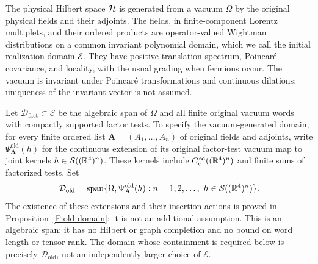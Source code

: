 \begin{assumption}\label{ass:framework}
The physical Hilbert space $\mathcal H$ is generated from a vacuum $\Omega$ by
the original physical fields and their adjoints. The fields, in finite-component
Lorentz multiplets, and their ordered products are operator-valued
Wightman distributions on a common invariant polynomial domain, which we
call the initial realization domain $\mathcal E$. They have positive translation spectrum,
Poincar\'e covariance, and locality,
with the usual grading when fermions occur. The vacuum is invariant under
Poincar\'e transformations and continuous dilations; uniqueness of the
invariant vector is not assumed.

Let $\mathcal D_{\mathrm{fact}}\subset\mathcal E$ be the algebraic span of
$\Omega$ and all finite original vacuum words with compactly supported
factor tests. To specify the vacuum-generated domain, for every finite ordered list $\mathbf A=(A_1,\ldots,A_n)$ of original fields and adjoints,
write $\Psi^{\mathrm{old}}_{\mathbf A}(h)$ for the continuous extension of
its original factor-test vacuum map to joint kernels
$h\in\mathcal S((\mathbb R^4)^n)$. These kernels
include $C_c^\infty((\mathbb R^4)^n)$ and finite sums of factorized tests. Set
\[
 \mathcal D_{\mathrm{old}}
 =\operatorname{span}\{\Omega,\Psi^{\mathrm{old}}_{\mathbf A}(h):
          n=1,2,\ldots,\ h\in\mathcal S((\mathbb R^4)^n)\}.
\]
The existence of these extensions and their insertion actions is proved
in Proposition~\ref{F:old-domain}; it is not an additional assumption.
This is an algebraic span: it has no
Hilbert or graph completion and no bound on word length or tensor rank.
The domain whose containment is required below is precisely
$\mathcal D_{\mathrm{old}}$, not an independently larger choice of
$\mathcal E$.


\end{assumption}
